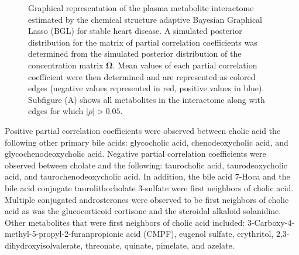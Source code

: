 \begin{DoubleSpace*}
\begin{figure}[H]
	\caption[Graphical representations of the plasma metabolite interactome estimated by the chemical structure adaptive Bayesian Graphical Lasso (BGL) for stable heart disease with subfigures showing the global model as well as the model focused on cholate and its neighbors]{Graphical representation of the plasma metabolite interactome estimated by the chemical structure adaptive Bayesian Graphical Lasso (BGL) for stable heart disease. A simulated posterior distribution for the matrix of partial correlation coefficients was determined from the simulated posterior distribution of the concentration matrix $\boldsymbol{\Omega}$.  Mean values of each partial correlation coefficient were then determined and are represented as colored edges (negative values represented in red, positive values in blue). Subfigure (A) shows all metabolites in the interactome along with edges for which $|\rho|>0.05$.   \label{fig:stableInter} }
\end{figure}

Positive partial correlation coefficients were observed between cholic acid the following other primary bile acids: glycocholic acid, chenodeoxycholic acid, and glycochenodeoxycholic acid. Negative partial correlation coefficients were observed between cholate and the following: taurocholic acid, taurodeoxycholic acid, and taurochenodeoxycholic acid. In addition, the bile acid 7-Hoca and the bile acid conjugate taurolithocholate 3-sulfate were first neighbors of cholic acid. Multiple conjugated androsterones were observed to be first neighbors of cholic acid as was the glucocorticoid cortisone and the steroidal alkaloid solanidine. Other metabolites that were first neighbors of cholic acid included: 3-Carboxy-4-methyl-5-propyl-2-furanpropionic acid (CMPF), eugenol sulfate, erythritol, 2,3-dihydroxyisolvalerate, threonate, quinate, pimelate, and azelate.


\end{DoubleSpace*}
